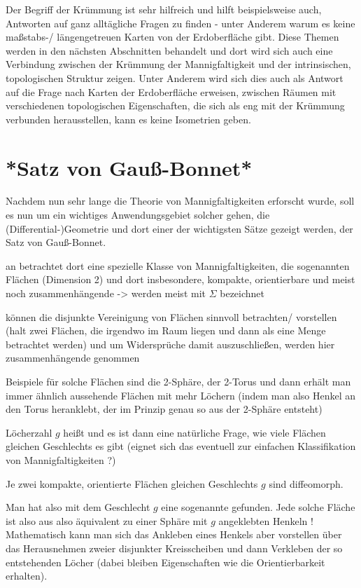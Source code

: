\documentclass[../H_Analysis_main.tex]{subfiles}
\begin{document}
Der Begriff der Krümmung ist sehr hilfreich und hilft beispielsweise auch, Antworten auf ganz alltägliche Fragen zu finden - unter Anderem warum es keine maßstabs-/ längengetreuen Karten von der Erdoberfläche gibt. Diese Themen werden in den nächsten Abschnitten behandelt und dort wird sich auch eine Verbindung zwischen der Krümmung der Mannigfaltigkeit und der intrinsischen, topologischen Struktur zeigen. Unter Anderem wird sich dies auch als Antwort auf die Frage nach Karten der Erdoberfläche erweisen, zwischen Räumen mit verschiedenen topologischen Eigenschaften, die sich als eng mit der Krümmung verbunden herausstellen, kann es keine Isometrien geben.


\newpage


	\section{*Satz von Gauß-Bonnet*}
Nachdem nun sehr lange die Theorie von Mannigfaltigkeiten erforscht wurde, soll es nun um ein wichtiges Anwendungsgebiet solcher gehen, die (Differential-)Geometrie und dort einer der wichtigsten Sätze gezeigt werden, der Satz von Gauß-Bonnet.


an betrachtet dort eine spezielle Klasse von Mannigfaltigkeiten, die sogenannten Flächen (Dimension 2) und dort insbesondere, kompakte, orientierbare und meist noch zusammenhängende -> werden meist mit $\Sigma$ bezeichnet

können die disjunkte Vereinigung von Flächen sinnvoll betrachten/ vorstellen (halt zwei Flächen, die irgendwo im Raum liegen und dann als eine Menge betrachtet werden) und um Widersprüche damit auszuschließen, werden hier zusammenhängende genommen

Beispiele für solche Flächen sind die 2-Sphäre, der 2-Torus und dann erhält man immer ähnlich aussehende Flächen mit mehr Löchern (indem man also Henkel an den Torus heranklebt, der im Prinzip genau so aus der 2-Sphäre entsteht)

Löcherzahl $g$ heißt  und es ist dann eine natürliche Frage, wie viele Flächen gleichen Geschlechts es gibt (eignet sich das eventuell zur einfachen Klassifikation von Mannigfaltigkeiten ?)

\begin{satz}
Je zwei kompakte, orientierte Flächen gleichen Geschlechts $g$ sind diffeomorph.
\end{satz}
Man hat also mit dem Geschlecht $g$ eine sogenannte  gefunden. Jede solche Fläche ist also aus also äquivalent zu einer Sphäre mit $g$ angeklebten Henkeln ! Mathematisch kann man sich das Ankleben eines Henkels aber vorstellen über das Herausnehmen zweier disjunkter Kreisscheiben und dann Verkleben der so entstehenden Löcher (dabei bleiben Eigenschaften wie die Orientierbarkeit erhalten).
\end{document}
